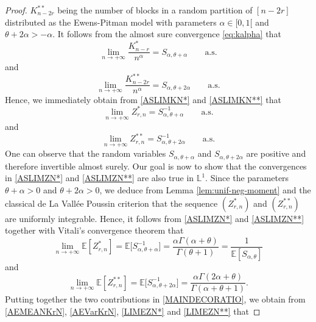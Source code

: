 \documentclass[twoside,12pt]{article}
\newcommand{\E}{\mathds{E}}
\newcommand{\dL}{\mathbb{L}}
\begin{document}
\begin{proof}
$K^{\ast\ast}_{n-2r}$ being the number of blocks in a random partition of $[n-2r]$ distributed as the Ewens-Pitman model with parameters $\alpha\in[0,1[$ and $\theta+2\alpha>-\alpha$. It follows from the almost sure convergence \eqref{eq:kalpha} that
\begin{equation}
\label{ASLIMKN*}
\lim_{n\rightarrow+\infty}\frac{K^{\ast}_{n-r}}{n^{\alpha}}=S_{\alpha,\theta+ \alpha}\qquad\text{a.s.}
\end{equation}
and
\begin{equation}
\label{ASLIMKN**}
\lim_{n\rightarrow+\infty}\frac{K^{\ast \ast}_{n-2r}}{n^{\alpha}}=S_{\alpha,\theta+ 2\alpha}\qquad\text{a.s.}
\end{equation}
Hence, we immediately obtain from \eqref{ASLIMKN*} and \eqref{ASLIMKN**} that
\begin{equation}
\label{ASLIMZN*}
\lim_{n\rightarrow+\infty} Z_{r,n}^{*} =S_{\alpha,\theta+ \alpha}^{-1}\qquad\text{a.s.}
\end{equation}
and
\begin{equation}
\label{ASLIMZN**}
\lim_{n\rightarrow+\infty} Z_{r,n}^{**} =S_{\alpha,\theta+ 2\alpha}^{-1}\qquad\text{a.s.}
\end{equation}
One can observe that the random variables $S_{\alpha,\theta+ \alpha}$ and $S_{\alpha,\theta+ 2\alpha}$ are positive and therefore invertible almost surely. Our goal is now to show that the convergences in \eqref{ASLIMZN*} and \eqref{ASLIMZN**} are also true in $\dL^1$. Since the parameters $\theta+\alpha>0$ and $\theta+2\alpha>0$, we deduce from Lemma \ref{lem:unif-neg-moment} and the classical de La Vall\'ee Poussin criterion that the sequence $(Z_{r,n}^{*})$ and $(Z_{r,n}^{**})$ are uniformly integrable. Hence, it follows from \eqref{ASLIMZN*} and \eqref{ASLIMZN**} together with Vitali's convergence theorem that
\begin{equation}
\label{LIMEZN*}
\lim_{n\rightarrow+\infty} \E[Z_{r,n}^*]=\E\big[S_{\alpha,\theta+ \alpha}^{-1}\big]
=\frac{\alpha \Gamma(\alpha+ \theta)}{\Gamma(\theta+1)}= \frac{1}{\E[S_{\alpha,\theta}]}
\end{equation}
and
\begin{equation}
\label{LIMEZN**}
\lim_{n\rightarrow+\infty} \E[Z_{r,n}^{**}]=\E\big[S_{\alpha,\theta+ 2\alpha}^{-1}\big]
=\frac{\alpha \Gamma(2\alpha+ \theta)}{\Gamma(\alpha+\theta+1)}.
\end{equation}
Putting together the two contributions in \eqref{MAINDECORATIO}, we obtain from \eqref{AEMEANKrN}, \eqref{AEVarKrN}, \eqref{LIMEZN*} and \eqref{LIMEZN**} that

\end{proof}
\end{document}
